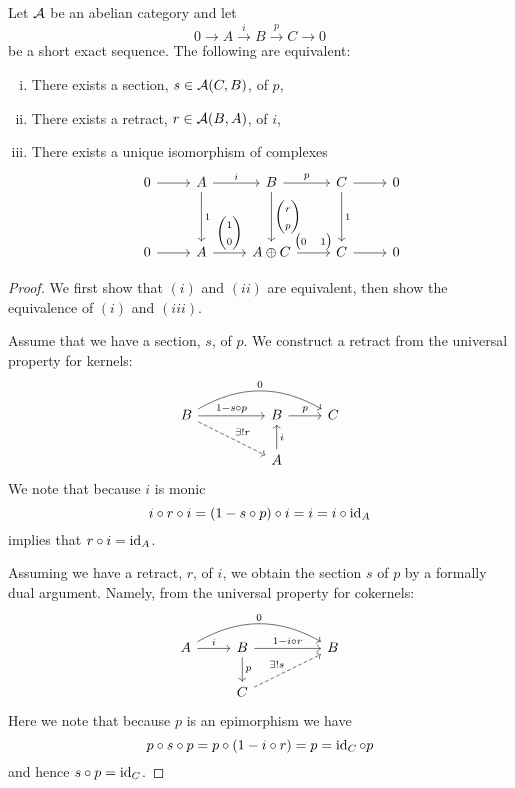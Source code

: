\documentclass[dissertation.tex]{subfiles}
\begin{document}
\begin{prop}
  Let $\mathcal{A}$ be an abelian category and let
  $$0 \to A \overset{i}\to B \overset{p}\to C \to 0$$
  be a short exact sequence.
  The following are equivalent:
  \begin{enumerate}[(i)]
  \item
    There exists a section, $s \in \mathcal{A}(C,B)$, of $p$,
  \item
    There exists a retract, $r \in \mathcal{A}(B,A)$, of $i$,
  \item
    There exists a unique isomorphism of complexes
    $$\begin{tikzcd}[ampersand replacement=\&]
      0 \arrow{r} \& A \arrow{r}{i}\arrow{dd}{1} \& B \arrow{r}{p}\arrow{dd}{\left(\begin{matrix}r\\p\end{matrix}\right)} \& C \arrow{r}\arrow{dd}{1} \& 0\\
      \\
      0 \arrow{r} \& A \arrow{r}{\left(\begin{matrix}1\\0\end{matrix}\right)} \& A \oplus C \arrow{r}{\left(\begin{matrix}0 & 1\end{matrix}\right)} \& C \arrow{r} \& 0
    \end{tikzcd}$$
  \end{enumerate}

  \begin{proof}
    We first show that $(i)$ and $(ii)$ are equivalent, then show the equivalence of $(i)$ and $(iii)$.

    Assume that we have a section, $s$, of $p$.
    We construct a retract from the universal property for kernels:
    $$\begin{tikzcd}
      B \arrow{rr}{1 - s \circ p}\arrow[bend left]{rrr}{0}\arrow[dashed]{rrd}{\exists ! r} && B \arrow{r}{p} & C\\
      && A \arrow[swap]{u}{i}
    \end{tikzcd}$$
    We note that because $i$ is monic
    $$i \circ r \circ i = (1 - s \circ p) \circ i = i = i \circ \operatorname{id}_A$$
    implies that $r \circ i = \operatorname{id}_A$.

    Assuming we have a retract, $r$, of $i$, we obtain the section $s$ of $p$ by a formally dual argument.
    Namely, from the universal property for cokernels:
    $$\begin{tikzcd}
      A \arrow{r}{i}\arrow[bend left]{rrr}{0} & B\arrow{d}{p} \arrow{rr}{1 - i \circ r} && B\\
      & C \arrow[dashed]{urr}{\exists !s}
    \end{tikzcd}$$
    Here we note that because $p$ is an epimorphism we have
    $$p \circ s \circ p = p \circ (1 - i \circ r) = p = \operatorname{id}_C \circ p$$
    and hence  $s \circ p = \operatorname{id}_C$.


\end{proof}
\end{prop}
\end{document}
